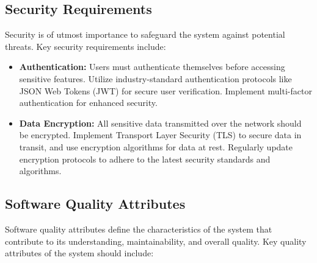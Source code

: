 \documentclass{article}
\begin{document}
\vspace{1em}  %

\subsection{Security Requirements}
Security is of utmost importance to safeguard the system against potential threats. Key security requirements include:

\vspace{1em}  %

\begin{itemize}
    \item \textbf{Authentication:} Users must authenticate themselves before accessing sensitive features. Utilize industry-standard authentication protocols like JSON Web Tokens (JWT) for secure user verification. Implement multi-factor authentication for enhanced security.

    \item \textbf{Data Encryption:} All sensitive data transmitted over the network should be encrypted. Implement Transport Layer Security (TLS) to secure data in transit, and use encryption algorithms for data at rest. Regularly update encryption protocols to adhere to the latest security standards and algorithms.
\end{itemize}

\subsection{Software Quality Attributes}
Software quality attributes define the characteristics of the system that contribute to its understanding, maintainability, and overall quality. Key quality attributes of the system should include:

\vspace{1em}
\end{document}
